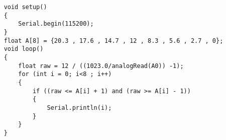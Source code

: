 \codeExample

\begin{verbatim}
    void setup()
    {
        Serial.begin(115200);
    }
    float A[8] = {20.3 , 17.6 , 14.7 , 12 , 8.3 , 5.6 , 2.7 , 0};
    void loop()
    {
        float raw = 12 / ((1023.0/analogRead(A0)) -1);
        for (int i = 0; i<8 ; i++)
        {
            if ((raw <= A[i] + 1) and (raw >= A[i] - 1))
            {
                Serial.println(i);
            }
        } 
    }
\end{verbatim}
